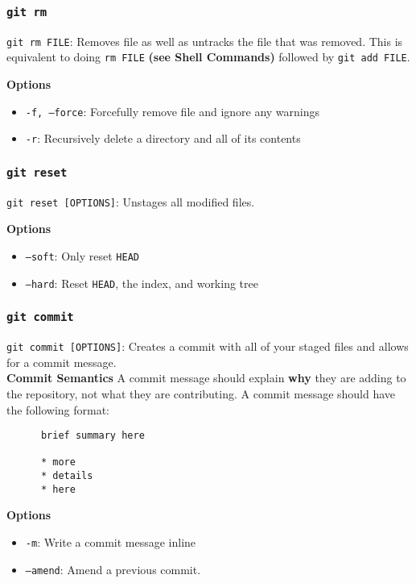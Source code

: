 \documentclass[13pt]{article}
\begin{document}
\subsubsection*{\texttt{git rm}}
\texttt{git rm FILE}: Removes file as well as untracks the file that was removed. This is equivalent to doing \texttt{rm FILE} \textbf{(see Shell Commands)} followed by \texttt{git add FILE}.

\textbf{Options} 
\begin{itemize}[label=]         
\item \texttt{-f, --force}: Forcefully remove file and ignore any warnings
\item \texttt{-r}: Recursively delete a directory and all of its contents
\end{itemize}

\subsubsection*{\texttt{git reset}}
\texttt{git reset [OPTIONS]}: Unstages all modified files.

\textbf{Options}
\begin{itemize}[label=]
\item \texttt{--soft}: Only reset \texttt{HEAD}
\item \texttt{--hard}: Reset \texttt{HEAD}, the index, and working tree
\end{itemize}

\subsubsection*{\texttt{git commit}}
\texttt{git commit [OPTIONS]}: Creates a commit with all of your staged files and allows for a commit message. \\

\textbf{Commit Semantics}
A commit message should explain \textbf{why} they are adding to the repository, not what they are contributing. A commit message should have the following format:
\begin{verbatim}
      brief summary here

      * more
      * details
      * here
\end{verbatim}

\textbf{Options}
\begin{itemize}
\item [] \texttt{-m}: Write a commit message inline
\item [] \texttt{--amend}: Amend a previous commit.
\end{itemize}
\end{document}

